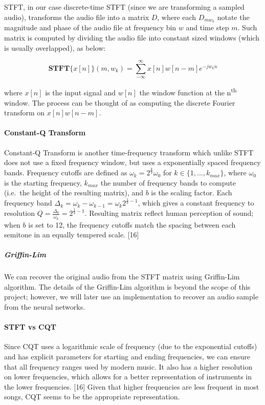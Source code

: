 \documentclass[12pt,a4paper,]{report}
\begin{document}
STFT, in our case discrete-time STFT (since we are transforming a
sampled audio), transforms the audio file into a matrix \(D\), where
each \(D_{mw_{k}}\) notate the magnitude and phase of the audio file at
frequency bin \(w\) and time step \(m\). Such matrix is computed by
dividing the audio file into constant sized windows (which is usually
overlapped), as below:

\begin{equation}
    \mathbf{STFT}\{x[n]\}(m, w_k) = \sum_{-\infty}^{\infty} x[n]w[n - m]e^{-jw_kn}
\end{equation}

where \(x[n]\) is the input signal and \(w[n]\) the window function at
the n\textsuperscript{th} window. The process can be thought of as
computing the discrete Fourier transform on \(x[n]w[n - m]\).

\paragraph{Constant-Q Transform}

Constant-Q Transform is another time-frequency transform which unlike
STFT does not use a fixed frequency window, but uses a exponentially
spaced frequency bands. Frequency cutoffs are defined as
\(\omega_k = 2^{\frac{k}{b}} \omega_0\) for
\(k \in \{ 1, ..., k_{max}\}\), where \(\omega_0\) is the starting
frequency, \(k_{max}\) the number of frequency bands to compute
(i.e.~the height of the resulting matrix), and \(b\) is the scaling
factor. Each frequency band
\(\Delta_k = \omega_k - \omega_{k-1} = \omega_k 2^{\frac{1}{b} - 1}\),
which gives a constant frequency to resolution
\(Q = \frac{\Delta_k}{\omega_k} = 2^{\frac{1}{b} -1}\). Resulting matrix
reflect human perception of sound; when \(b\) is set to 12, the
frequency cutoffs match the spacing between each semitone in an equally
tempered scale. {[}16{]}

\subparagraph{Griffin-Lim}

We can recover the original audio from the STFT matrix using Griffin-Lim
algorithm. The details of the Griffin-Lim algorithm is beyond the scope
of this project; however, we will later use an implementation to recover
an audio sample from the neural networks.

\paragraph{STFT vs CQT}

Since CQT uses a logarithmic scale of frequency (due to the exponential
cutoffs) and has explicit parameters for starting and ending
frequencies, we can ensure that all frequency ranges used by modern
music. It also has a higher resolution on lower frequencies, which
allows for a better representation of instruments in the lower
frequencies. {[}16{]} Given that higher frequencies are less frequent in
most songs, CQT seems to be the appropriate representation.
\end{document}
